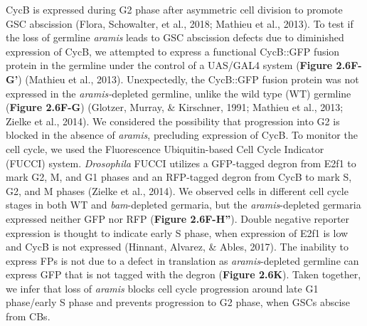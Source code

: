 \documentclass[12pt,oneside]{reedthesis}
\begin{document}
CycB is expressed during G2 phase after asymmetric cell division to promote GSC abscission (Flora, Schowalter, et al., 2018; Mathieu et al., 2013). To test if the loss of germline \emph{aramis} leads to GSC abscission defects due to diminished expression of CycB, we attempted to express a functional CycB::GFP fusion protein in the germline under the control of a UAS/GAL4 system (\textbf{Figure 2.6F-G'}) (Mathieu et al., 2013). Unexpectedly, the CycB::GFP fusion protein was not expressed in the \emph{aramis-}depleted germline, unlike the wild type (WT) germline (\textbf{Figure 2.6F-G}) (Glotzer, Murray, \& Kirschner, 1991; Mathieu et al., 2013; Zielke et al., 2014). We considered the possibility that progression into G2 is blocked in the absence of \emph{aramis}, precluding expression of CycB. To monitor the cell cycle, we used the Fluorescence Ubiquitin-based Cell Cycle Indicator (FUCCI) system. \emph{Drosophila} FUCCI utilizes a GFP-tagged degron from E2f1 to mark G2, M, and G1 phases and an RFP-tagged degron from CycB to mark S, G2, and M phases (Zielke et al., 2014). We observed cells in different cell cycle stages in both WT and \emph{bam}-depleted germaria, but the \emph{aramis}-depleted germaria expressed neither GFP nor RFP (\textbf{Figure 2.6F-H''}). Double negative reporter expression is thought to indicate early S phase, when expression of E2f1 is low and CycB is not expressed (Hinnant, Alvarez, \& Ables, 2017). The inability to express FPs is not due to a defect in translation as \emph{aramis}-depleted germline can express GFP that is not tagged with the degron (\textbf{Figure 2.6K}). Taken together, we infer that loss of \emph{aramis} blocks cell cycle progression around late G1 phase/early S phase and prevents progression to G2 phase, when GSCs abscise from CBs.
\end{document}
